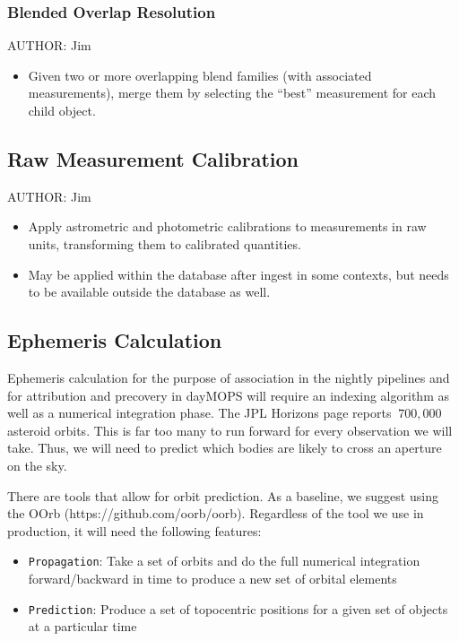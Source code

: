 \subsubsection{Blended Overlap Resolution}
\label{sec:acBlendedOverlapResolution}
AUTHOR: Jim
\begin{itemize}
\item Given two or more overlapping blend families (with associated measurements), merge them by selecting the ``best'' measurement for each child object.
\end{itemize}

\subsection{Raw Measurement Calibration}
\label{sec:acRawMeasurementCalibration}

AUTHOR: Jim
\begin{itemize}
\item Apply astrometric and photometric calibrations to measurements in raw units, transforming them to calibrated quantities.
\item May be applied within the database after ingest in some contexts, but needs to be available outside the database as well.
\end{itemize}


\subsection{Ephemeris Calculation}
\label{sec:acEphemerisCalculation}
Ephemeris calculation for the purpose of association in the nightly pipelines and for attribution and precovery in dayMOPS will require an indexing algorithm as well as a numerical integration phase. The JPL Horizons page reports $~700,000$ asteroid orbits.  This is far too many to run forward for every observation we will take.  Thus, we will need to predict which bodies are likely to cross an aperture on the sky.  

There are tools that allow for orbit prediction.  As a baseline, we suggest using the OOrb (https://github.com/oorb/oorb).  Regardless of the tool we use in production, it will need the following features:
\begin{itemize}
\item {\tt Propagation}: Take a set of orbits and do the full numerical integration forward/backward in time to produce a new set of orbital elements
\item {\tt Prediction}: Produce a set of topocentric positions for a given set of objects at a particular time
\end{itemize}

